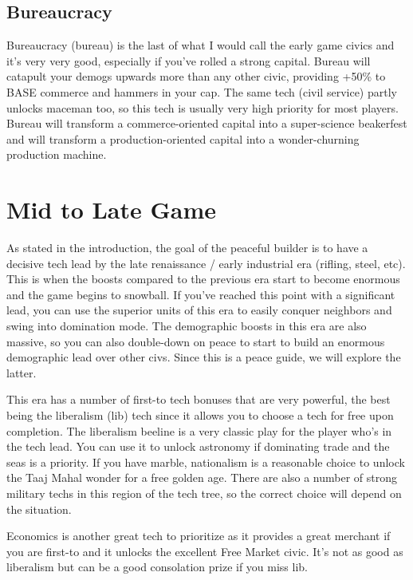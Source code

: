 \documentclass[10pt]{article}
\begin{document}
\subsection*{Bureaucracy}

Bureaucracy (bureau) is the last of what I would call the early game
civics and it's very very good, especially if you've rolled a strong
capital. Bureau will catapult your demogs upwards more than any other
civic, providing +50\% to BASE commerce and hammers in your cap. The
same tech (civil service) partly unlocks maceman too, so this tech is
usually very high priority for most players. Bureau will transform a
commerce-oriented capital into a super-science beakerfest and will
transform a production-oriented capital into a wonder-churning
production machine.

\section*{Mid to Late Game}

As stated in the introduction, the goal of the peaceful builder is to
have a decisive tech lead by the late renaissance / early industrial
era (rifling, steel, etc). This is when the boosts compared to the
previous era start to become enormous and the game begins to
snowball. If you've reached this point with a significant lead, you
can use the superior units of this era to easily conquer neighbors and
swing into domination mode. The demographic boosts in this era are
also massive, so you can also double-down on peace to start to build
an enormous demographic lead over other civs. Since this is a peace
guide, we will explore the latter.

This era has a number of first-to tech bonuses that are very powerful,
the best being the liberalism (lib) tech since it allows you to choose
a tech for free upon completion. The liberalism beeline is a very
classic play for the player who's in the tech lead. You can use it to
unlock astronomy if dominating trade and the seas is a priority. If
you have marble, nationalism is a reasonable choice to unlock the Taaj
Mahal wonder for a free golden age. There are also a number of strong
military techs in this region of the tech tree, so the correct choice
will depend on the situation.

Economics is another great tech to prioritize as it provides a great
merchant if you are first-to and it unlocks the excellent Free Market
civic. It's not as good as liberalism but can be a good consolation
prize if you miss lib.
\end{document}

